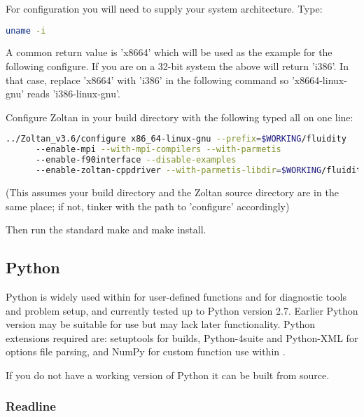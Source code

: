 For configuration you will need to supply your system architecture. Type:

\begin{lstlisting}[language=bash]
   uname -i
\end{lstlisting}

A common return value is 'x86{\textunderscore}64' which will be used as the
example for the following configure. If you are on a 32-bit system the above
will return 'i386'. In that case, replace 'x86{\textunderscore}64' with 'i386' in
the following command so 'x86{\textunderscore}64-linux-gnu' reads
'i386-linux-gnu'.

Configure Zoltan in your build directory with the following typed all on one
line:

\begin{lstlisting}[language=bash]
   ../Zoltan_v3.6/configure x86_64-linux-gnu --prefix=$WORKING/fluidity
      --enable-mpi --with-mpi-compilers --with-parmetis
      --enable-f90interface --disable-examples
      --enable-zoltan-cppdriver --with-parmetis-libdir=$WORKING/fluidity/lib
\end{lstlisting}

(This assumes your build directory and the Zoltan source directory are in the
same place; if not, tinker with the path to 'configure' accordingly)

Then run the standard make and make install.

\subsection{Python}
\label{sec:required_libraries_python}

Python is widely used within \fluidity for user-defined functions and for
diagnostic tools and problem setup, and currently tested up to Python version
2.7. Earlier Python version may be suitable for use but may lack later
functionality. Python extensions required are: setuptools for \fluidity builds,
Python-4suite and Python-XML for options file parsing, and NumPy for custom
function use within \fluidity.

If you do not have a working version of Python it can be built from source. 

\subsubsection{Readline}
\label{sec:required_libraries_python_readline}

